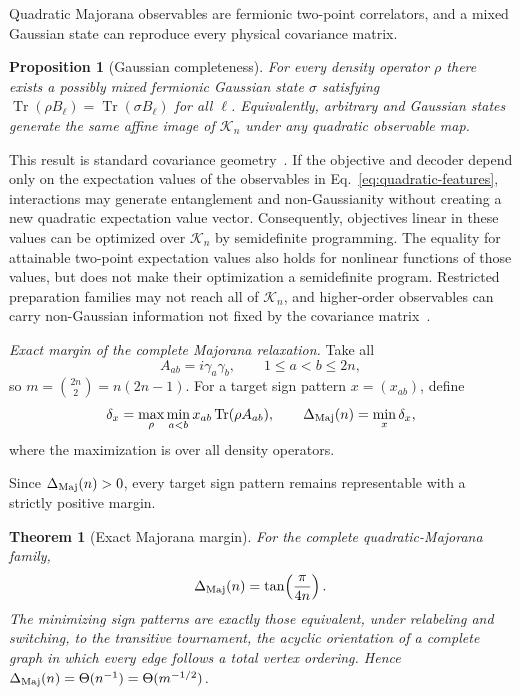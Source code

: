 \documentclass[10pt,aps,pra,twocolumn,superscriptaddress,nofootinbib,longbibliography]{revtex4-2}
\newtheorem{theorem}{Theorem}
\newtheorem{proposition}{Proposition}
\newcommand{\Tr}{\operatorname{Tr}}
\newcommand{\calK}{\mathcal{K}}
\begin{document}
Quadratic Majorana observables are fermionic two-point correlators, and a mixed Gaussian state can reproduce every physical covariance matrix.

\begin{proposition}[Gaussian completeness]
\label{thm:gaussian}
For every density operator $\rho$ there exists a possibly mixed fermionic Gaussian state $\sigma$ satisfying $\Tr(\rho B_\ell)=\Tr(\sigma B_\ell)$ for all $\ell$.  Equivalently, arbitrary and Gaussian states generate the same affine image of $\calK_n$ under any quadratic observable map.
\end{proposition}

This result is standard covariance geometry~\cite{Bravyi2005Lagrangian,DiVincenzoTerhal2005FLO,Wan2023MatchgateShadows}.  If the objective and decoder depend only on the expectation values of the observables in Eq.~\eqref{eq:quadratic-features}, interactions may generate entanglement and non-Gaussianity without creating a new quadratic expectation value vector.  Consequently, objectives linear in these values can be optimized over $\calK_n$ by semidefinite programming.  The equality for attainable two-point expectation values also holds for nonlinear functions of those values, but does not make their optimization a semidefinite program.  Restricted preparation families may not reach all of $\calK_n$, and higher-order observables can carry non-Gaussian information not fixed by the covariance matrix~\cite{Bravyi2019ManyBody,HastingsODonnell2022}.

\emph{Exact margin of the complete Majorana relaxation.}
Take all
\begin{equation}
    A_{ab}=i\gamma_a\gamma_b,\qquad 1\le a<b\le2n,
\end{equation}
so $m=\binom{2n}{2}=n(2n-1)$.  For a target sign pattern $x=(x_{ab})$, define
\begin{equation}
    \delta_x=\max_\rho\min_{a<b}x_{ab}\Tr(\rho A_{ab}),
    \qquad
    \Delta_{\rm Maj}(n)=\min_x\delta_x,
    \label{eq:majorana-margin-def}
\end{equation}
where the maximization is over all density operators.

Since $\Delta_{\rm Maj}(n)>0$, every target sign pattern remains representable with a strictly positive margin.

\begin{theorem}[Exact Majorana margin]
\label{thm:exact-majorana}
For the complete quadratic-Majorana family,
\begin{equation}
    \Delta_{\rm Maj}(n)=\tan\!\left(\frac{\pi}{4n}\right).
    \label{eq:exact-majorana}
\end{equation}
The minimizing sign patterns are exactly those equivalent, under relabeling and switching, to the transitive tournament, the acyclic orientation of a complete graph in which every edge follows a total vertex ordering.  Hence $\Delta_{\rm Maj}(n)=\Theta(n^{-1})=\Theta(m^{-1/2})$.
\end{theorem}
\end{document}
